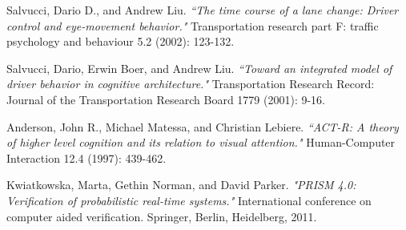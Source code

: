 \documentclass[a4paper]{article}
\begin{document}
\begin{thebibliography}{9}
Salvucci, Dario D., and Andrew Liu. \textit{``The time course of a lane change: Driver control and eye-movement behavior."} Transportation research part F: traffic psychology and behaviour 5.2 (2002): 123-132.

Salvucci, Dario, Erwin Boer, and Andrew Liu. \textit{``Toward an integrated model of driver behavior in cognitive architecture."} Transportation Research Record: Journal of the Transportation Research Board 1779 (2001): 9-16.

Anderson, John R., Michael Matessa, and Christian Lebiere. \textit{``ACT-R: A theory of higher level cognition and its relation to visual attention."} Human-Computer Interaction 12.4 (1997): 439-462.

Kwiatkowska, Marta, Gethin Norman, and David Parker. \textit{"PRISM 4.0: Verification of probabilistic real-time systems."} International conference on computer aided verification. Springer, Berlin, Heidelberg, 2011.

\end{thebibliography}
\end{document}
